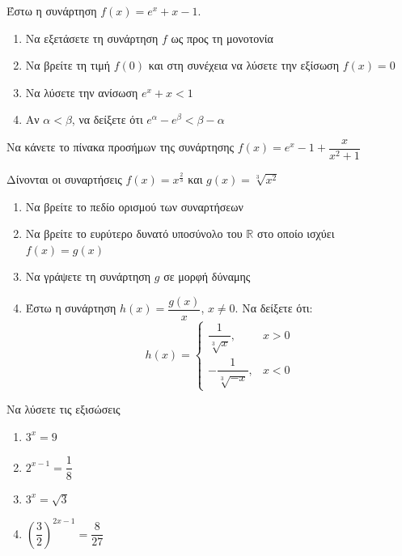 \documentclass{presentation}
\begin{document}
\begin{askisi}
  Έστω η συνάρτηση $f(x)=e^x+x-1$.
  \begin{enumerate}
    \item<1-> Να εξετάσετε τη συνάρτηση $f$ ως προς τη μονοτονία
    \item<2-> Να βρείτε τη τιμή $f(0)$ και στη συνέχεια να λύσετε την εξίσωση $f(x)=0$
    \item<3-> Να λύσετε την ανίσωση $e^x+x<1$
    \item<4-> Αν $α<β$, να δείξετε ότι $e^α-e^β<β-α$
  \end{enumerate}


\end{askisi}

\begin{askisi}
  Να κάνετε το πίνακα προσήμων της συνάρτησης $f(x)=e^x-1+\dfrac{x}{x^2+1}$


\end{askisi}

\begin{askisi}
  Δίνονται οι συναρτήσεις $f(x)=x^{\frac{2}{3}}$ και $g(x)=\sqrt[3]{x^2}$
  \begin{enumerate}
    \item<1-> Να βρείτε το πεδίο ορισμού των συναρτήσεων
    \item<2-> Να βρείτε το ευρύτερο δυνατό υποσύνολο του $\mathbb{R}$ στο οποίο ισχύει $f(x)=g(x)$
    \item<3-> Να γράψετε τη συνάρτηση $g$ σε μορφή δύναμης
    \item<4-> Έστω η συνάρτηση $h(x)=\dfrac{g(x)}{x}$, $x\ne 0$. Να δείξετε ότι:
          $$h(x)=\begin{cases}
              \dfrac{1}{\sqrt[3]{x}},   & x>0 \\
              -\dfrac{1}{\sqrt[3]{-x}}, & x<0
            \end{cases}$$
  \end{enumerate}


\end{askisi}

\begin{askisi}
  Να λύσετε τις εξισώσεις
  \begin{enumerate}
    \item<1-> $3^x=9$
    \item<2-> $2^{x-1}=\dfrac{1}{8}$
    \item<3-> $3^x=\sqrt{3}$
    \item<4-> $\left( \dfrac{3}{2} \right)^{2x-1}=\dfrac{8}{27}$
  \end{enumerate}


\end{askisi}
\end{document}
